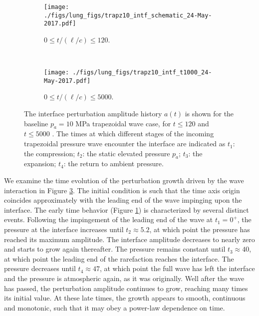 \documentclass{jfm}%
\begin{document}
\begin{figure} 
  \centering
  \begin{subfigure}[b]{0.45\textwidth}
    \centering
    \texttt{[image: ./figs/lung\_figs/trapz10\_intf\_schematic\_24-May-2017.pdf]}
    \caption{\label{fig:trapz10_interface25} $0 \leq t/(\ell/c) \leq 120$.}
  \end{subfigure}
  ~
  \begin{subfigure}[b]{0.45\textwidth}
    \centering
    \texttt{[image: ./figs/lung\_figs/trapz10\_intf\_t1000\_24-May-2017.pdf]}%
    \caption{\label{fig:trapz10_interface1000} $0 \leq t/(\ell/c) \leq 5000$.}
  \end{subfigure}
  \caption[Interface perturbation amplitude history for $p_a = 10$ MPa
  trapezoidal wave]{The interface perturbation amplitude history
    $a(t)$ is shown for the baseline $p_a = 10$ MPa trapezoidal wave
    case, for $t \leq 120$ \protect{}
    and $t \leq 5000$ \protect{}. The
    times at which different stages of the incoming trapezoidal
    pressure wave encounter the interface are indicated as $t_1$: the
    compression; $t_2$: the static elevated pressure $p_a$; $t_3$: the
    expansion; $t_4$: the return to ambient pressure.}
  \label{fig:trapz10_interface}
\end{figure}\par
% 
We examine the time evolution of the perturbation growth driven by the
wave interaction in Figure \ref{fig:trapz10_interface}. The initial
condition is such that the time axis origin coincides approximately
with the leading end of the wave impinging upon the interface. The
early time behavior (Figure \ref{fig:trapz10_interface25}) is
characterized by several distinct events. Following the impingement of
the leading end of the wave at $t_1=0^+$, the pressure at the interface
increases until $t_2\approx5.2$, at which point the pressure has reached its
maximum amplitude. The interface amplitude decreases to nearly zero
and starts to grow again thereafter. The pressure remains constant
until $t_3\approx40$, at which point the leading end of the rarefaction reaches
the interface. The pressure decreases until $t_4\approx47$, at which point the
full wave has left the interface and the pressure is atmospheric
again, as it was originally. Well after the wave has passed, the
perturbation amplitude continues to grow, reaching many times its
initial value. At these late times, the growth appears to smooth,
continuous and monotonic, such that it may obey a power-law dependence
on time.
% 
% 
\end{document}
